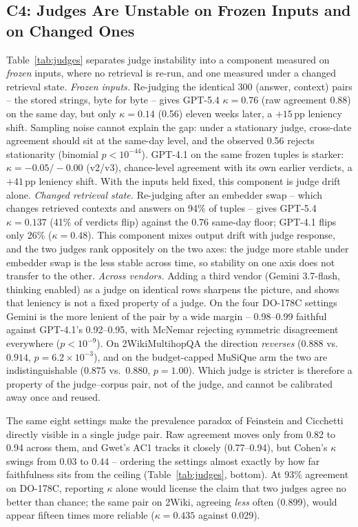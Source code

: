 \subsection{C4: Judges Are Unstable on Frozen Inputs and on Changed Ones}
\label{sec:c4}
Table~\ref{tab:judges} separates judge instability into a component
measured on \emph{frozen} inputs, where no retrieval is re-run, and one
measured under a changed retrieval state.
\noindent\textit{Frozen inputs.} Re-judging the identical 300
(answer, context) pairs -- the stored strings, byte for byte -- gives
GPT-5.4 $\kappa{=}0.76$ (raw agreement 0.88) on the same day, but only
$\kappa{=}0.14$ (0.56) eleven weeks later, a $+15$\,pp leniency shift.
Sampling noise cannot explain the gap: under a stationary judge,
cross-date agreement should sit at the same-day level, and the observed
0.56 rejects stationarity (binomial $p{<}10^{-44}$). GPT-4.1 on the
same frozen tuples is starker: $\kappa{=}{-}0.05/{-}0.00$ (v2/v3),
chance-level agreement with its own earlier verdicts, a $+41$\,pp
leniency shift. With the inputs held fixed, this component is judge
drift alone.
\noindent\textit{Changed retrieval state.} Re-judging after an embedder
swap -- which changes retrieved contexts and answers on 94\% of tuples
-- gives GPT-5.4 $\kappa{=}0.137$ (41\% of verdicts flip) against the
$0.76$ same-day floor; GPT-4.1 flips only 26\% ($\kappa{=}0.48$). This
component mixes output drift with judge response, and the two judges
rank oppositely on the two axes: the judge more stable under embedder
swap is the less stable across time, so stability on one axis does not
transfer to the other.
\noindent\textit{Across vendors.} Adding a third vendor
(Gemini 3.7-flash, thinking enabled) as a judge on identical rows
sharpens the picture, and shows that leniency is not a fixed property of
a judge. On the four DO-178C settings Gemini is the more lenient of the
pair by a wide margin -- 0.98--0.99 faithful against GPT-4.1's
0.92--0.95, with McNemar rejecting symmetric disagreement everywhere
($p{<}10^{-9}$). On 2WikiMultihopQA the direction \emph{reverses}
($0.888$ vs.\ $0.914$, $p{=}6.2{\times}10^{-3}$), and on the
budget-capped MuSiQue arm the two are indistinguishable ($0.875$ vs.\
$0.880$, $p{=}1.00$). Which judge is stricter is therefore a property of
the judge--corpus pair, not of the judge, and cannot be calibrated away
once and reused.

The same eight settings make the prevalence paradox of Feinstein and
Cicchetti~\cite{feinstein1990} directly visible in a single judge pair.
Raw agreement moves only from 0.82 to 0.94 across them, and Gwet's AC1
tracks it closely (0.77--0.94), but Cohen's $\kappa$ swings from $0.03$
to $0.44$ -- ordering the settings almost exactly by how far
faithfulness sits from the ceiling (Table~\ref{tab:judges}, bottom).
At 93\% agreement on DO-178C, reporting $\kappa$ alone would license the
claim that two judges agree no better than chance; the same pair on
2Wiki, agreeing \emph{less} often (0.899), would appear fifteen times
more reliable ($\kappa{=}0.435$ against $0.029$).

